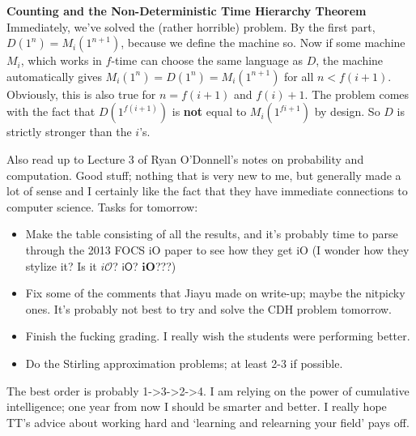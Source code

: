 \documentclass{tufte-book}
\newenvironment{loggentry}[2]%
{\noindent\textbf{#2}\marginnote{#1}\\}{\vspace{0.5cm}}
\begin{document}
\begin{loggentry}{2024-Feb-15}{Counting and the Non-Deterministic Time Hierarchy Theorem}
	Immediately, we've solved the (rather horrible) problem. By the first part, $D(1^n)=M_i(1^{n+1})$, because we define the machine so. Now if some machine $M_i$, which works in $f$-time can choose the same language as $D$, the machine automatically gives $M_i(1^n)=D(1^n)=M_i(1^{n+1})$ for all $n<f(i+1)$. Obviously, this is also true for $n=f(i+1)$ and $f(i)+1$. The problem comes with the fact that $D(1^{f(i+1)})$ is \textbf{not} equal to $M_i(1^{f{i+1}})$ by design. So $D$ is strictly stronger than the $i$'s.
	
	
	\vspace{2mm}
	
	Also read up to Lecture 3 of Ryan O'Donnell's notes on probability and computation. Good stuff; nothing that is very new to me, but generally made a lot of sense and I certainly like the fact that they have immediate connections to computer science. Tasks for tomorrow:
	\begin{itemize}
		\item Make the table consisting of all the results, and it's probably time to parse through the 2013 FOCS iO paper to see how they get iO (I wonder how they stylize it? Is it $i\mathcal{O}$? $\mathsf{iO}$? $\mathbf{iO}$???)
		\item Fix some of the comments that Jiayu made on write-up; maybe the nitpicky ones. It's probably not best to try and solve the CDH problem tomorrow.
		\item Finish the fucking grading. I really wish the students were performing better.
		\item Do the Stirling approximation problems; at least 2-3 if possible.
	\end{itemize}

	The best order is probably 1->3->2->4. I am relying on the power of cumulative intelligence; one year from now I should be smarter and better. I really hope TT's advice about working hard and `learning and relearning your field' pays off.
	\end{loggentry}
\end{document}
